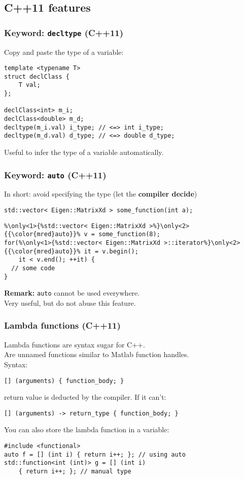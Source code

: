 \documentclass{beamer}
\newcommand{\code}[1]{{\color{cgreen}\texttt{#1}}}
\begin{document}
\subsection{C++11 features}

\begin{frame}[fragile]
 \frametitle{Keyword: \code{decltype} (C++11)}
 Copy and paste the type of a variable:
 \begin{lstlisting}
template <typename T>
struct declClass {
    T val;
};

declClass<int> m_i;
declClass<double> m_d;
decltype(m_i.val) i_type; // <=> int i_type;
decltype(m_d.val) d_type; // <=> double d_type;
\end{lstlisting}
Useful to infer the type of a variable automatically.
\end{frame}

\begin{frame}[fragile]
\frametitle{Keyword: \code{auto} (C++11)}
 In short: avoid specifying the type (let the \textbf{compiler decide})
\begin{lstlisting}
std::vector< Eigen::MatrixXd > some_function(int a);
\end{lstlisting}
\begin{lstlisting}
%\only<1>{%std::vector< Eigen::MatrixXd >%}\only<2>{{\color{mred}auto}}% v = some_function(8);
for(%\only<1>{%std::vector< Eigen::MatrixXd >::iterator%}\only<2>{{\color{mred}auto}}% it = v.begin();
    it < v.end(); ++it) {
  // some code
}
\end{lstlisting}
 \textbf{Remark:} \code{auto} cannot be used everywhere. \\
 Very useful, but do not abuse this feature.
\end{frame}


\begin{frame}[fragile]
\frametitle{Lambda functions (C++11)}
 Lambda functions are syntax sugar for C++. \\
 Are unnamed functions similar to Matlab function handles. \\
 Syntax: \\
 \begin{lstlisting}
[] (arguments) { function_body; }
 \end{lstlisting}
 return value is deducted by the compiler. If it can't:
 \begin{lstlisting}
[] (arguments) -> return_type { function_body; }
 \end{lstlisting}
 You can also store the lambda function in a variable:
\begin{lstlisting}
#include <functional>
auto f = [] (int i) { return i++; }; // using auto
std::function<int (int)> g = [] (int i)
	{ return i++; }; // manual type
\end{lstlisting}
\end{frame}
\end{document}
